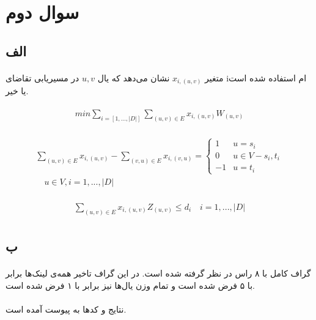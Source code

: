 \documentclass[paper=a4, fontsize=11pt]{article}
\numberwithin{equation}{section} %
\numberwithin{figure}{section} %
\numberwithin{table}{section} %
\begin{document}
\section{سوال دوم}
\subsection{الف}
\paragraph{}
متغیر $x_{i,(u,v)}$
نشان می‌دهد که یال $u,v$ در
مسیریابی تقاضای iام استفاده شده است یا خیر.

\begin{align}
\begin{split}
	min \sum_{i = [1, ..., |D|]}\sum_{(u,v) \in E} x_{i,(u,v)}W_{(u,v)}
\end{split}
\end{align}

\begin{align}
\begin{split}
	\sum_{(u,v) \in E} x_{i,(u,v)} - \sum_{(v,u) \in E} x_{i,(v,u)} = 
	\left \{
		\begin{array}{cc}
			1 & u = s_i\\
			0 & u \in V - {s_i, t_i}\\
			-1 & u = t_i
		\end{array}
	\right.
	\\
	\quad u \in V, i = {1, ..., |D|}
\end{split}
\end{align}

\begin{align}
\begin{split}
	\sum_{(u,v) \in E} x_{i,(u,v)}Z_{(u,v)} \le d_i
	\quad
	i = {1, ..., |D|}
\end{split}
\end{align}

\subsection{ب}
\paragraph{}
گراف کامل با ۸ راس در نظر گرفته شده است. در این گراف تاخیر همه‌ی لینک‌ها برابر با ۵ فرض شده است و تمام وزن یال‌ها نیز برابر با ۱ فرض شده است.
\paragraph{}
نتایج و کدها به پیوست آمده است.
\end{document}
